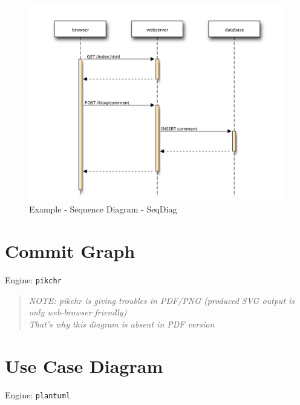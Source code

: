 \documentclass[
  12pt,
  a4paper,
  12pt,
  oneside,
  openany]{book}
\begin{document}
\begin{figure}

{\centering \includegraphics{generated/diagrams-examples-seqdiag-Rmd} 

}

\caption{Example - Sequence Diagram - SeqDiag}\label{fig:examples-sequence}
\end{figure}

\newpage

\hypertarget{kroki-commitgraph}{%
\section{Commit Graph}\label{kroki-commitgraph}}

Engine: \texttt{pikchr}

\begin{quote}
\emph{NOTE: pikchr is giving troubles in PDF/PNG (produced SVG output is only web-browser friendly)}\\
\emph{That's why this diagram is absent in PDF version}
\end{quote}

\newpage

\hypertarget{kroki-pumlUsecase}{%
\section{Use Case Diagram}\label{kroki-pumlUsecase}}

Engine: \texttt{plantuml}
\end{document}

